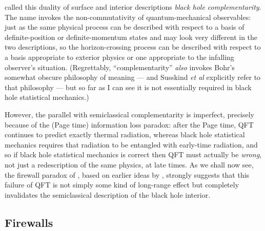 \documentclass[12pt]{article}
\begin{document}
 called this duality of surface and interior descriptions \emph{black hole complementarity}. The name invokes the non-commutativity of quantum-mechanical observables: just as the same physical process can be described with respect to a basis of definite-position or definite-momentum states and may look very different in the two descriptions, so the horizon-crossing process can be described with respect to a basis appropriate to exterior physics or one appropriate to the infalling observer's situation. (Regrettably, ``complementarity'' \emph{also} invokes Bohr's somewhat obscure philosophy of meaning --- and Susskind \emph{et al} explicitly refer to that philosophy --- but so far as I can see it is not essentially required in black hole statistical mechanics.)

However, the parallel with semiclassical complementarity is imperfect, precisely because of the (Page time) information loss paradox: after the Page time, QFT continues to predict exactly thermal radiation, whereas black hole statistical mechanics requires that radiation to be entangled with early-time radiation, and so if black hole statistical mechanics is correct then QFT must actually be \emph{wrong}, not just a redescription of the same physics, at late times. As we shall now see, the firewall paradox of , based on earlier ideas by , strongly suggests that this failure of QFT is not simply some kind of long-range effect but completely invalidates the semiclassical description of the black hole interior.

\subsection{Firewalls}\label{firewall-subsection}
\end{document}
